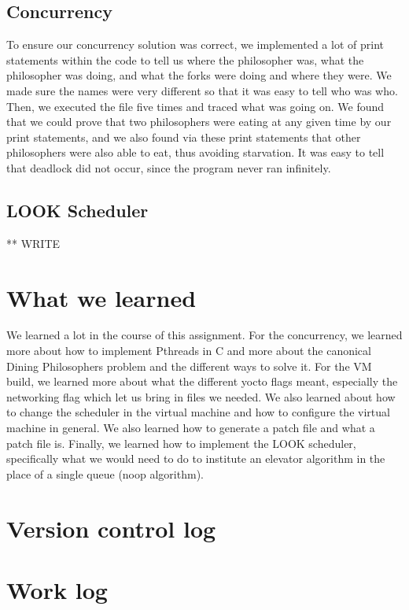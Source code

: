 \documentclass[letterpaper,10pt,titlepage]{article}
\begin{document}
\subsection{Concurrency}
To ensure our concurrency solution was correct, we implemented a lot of print statements within the code to tell us where the philosopher was, what the philosopher was doing, and what the forks were doing and where they were. We made sure the names were very different so that it was easy to tell who was who. Then, we executed the file five times and traced what was going on. We found that we could prove that two philosophers were eating at any given time by our print statements, and we also found via these print statements that other philosophers were also able to eat, thus avoiding starvation. It was easy to tell that deadlock did not occur, since the program never ran infinitely.  

\subsection{LOOK Scheduler}
** WRITE

\section{What we learned}
We learned a lot in the course of this assignment. For the concurrency, we learned more about how to implement Pthreads in C and more about the canonical Dining Philosophers problem and the different ways to solve it. For the VM build, we learned more about what the different yocto flags meant, especially the networking flag which let us bring in files we needed. We also learned about how to change the scheduler in the virtual machine and how to configure the virtual machine in general. We also learned how to generate a patch file and what a patch file is. Finally, we learned how to implement the LOOK scheduler, specifically what we would need to do to institute an elevator algorithm in the place of a single queue (noop algorithm).

\section{Version control log}
\begin{versionhistory}
\end{versionhistory}

\section{Work log}
\subsection{}

%
%
\end{document}
